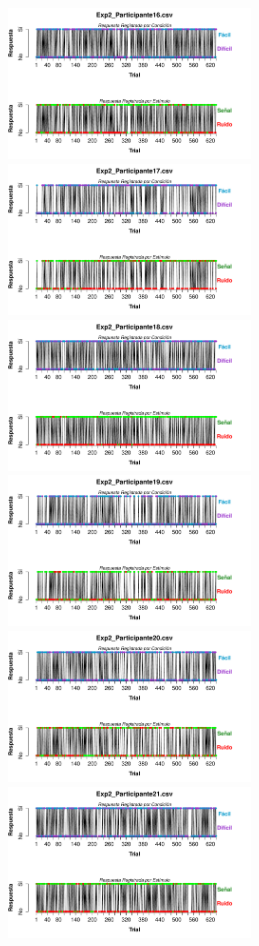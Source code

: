\documentclass[a4paper ]{article}
\begin{document}
\begin{figure}[th]
\begin{center}
\includegraphics[width=8cm, height=4cm]{Figures/BiasResp_Exp2_P16} \includegraphics[width=8cm, height=4cm]{Figures/BiasResp_Exp2_P17} \includegraphics[width=8cm, height=4cm]{Figures/BiasResp_Exp2_P18}
\includegraphics[width=8cm, height=4cm]{Figures/BiasResp_Exp2_P19} \includegraphics[width=8cm, height=4cm]{Figures/BiasResp_Exp2_P20} \includegraphics[width=8cm, height=4cm]{Figures/BiasResp_Exp2_P21} 
\end{center}
\end{figure}
\clearpage
\end{document}
